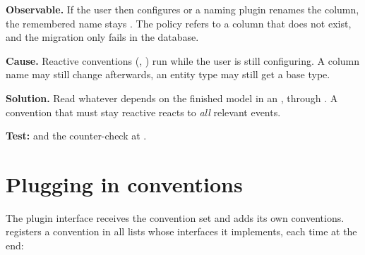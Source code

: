 \begin{failure}
  \textbf{Observable.} If the user then configures
   or a
  naming plugin renames the column, the remembered name stays
  . The policy refers to a column that does not exist, and the
  migration only fails in the database.

  \textbf{Cause.} Reactive conventions (, ) run while the user is
  still configuring. A column name may still change afterwards, an entity type may still get
  a base type.

  \textbf{Solution.} Read whatever depends on the finished model in an
  , through
  . A convention that must
  stay reactive reacts to \emph{all} relevant events.

  \textbf{Test:}
  and the counter-check at .
\end{failure}

\section{Plugging in conventions}

The plugin interface  receives the
convention set and adds its own conventions.
 registers a convention in all lists whose
interfaces it implements, each time at the end:

